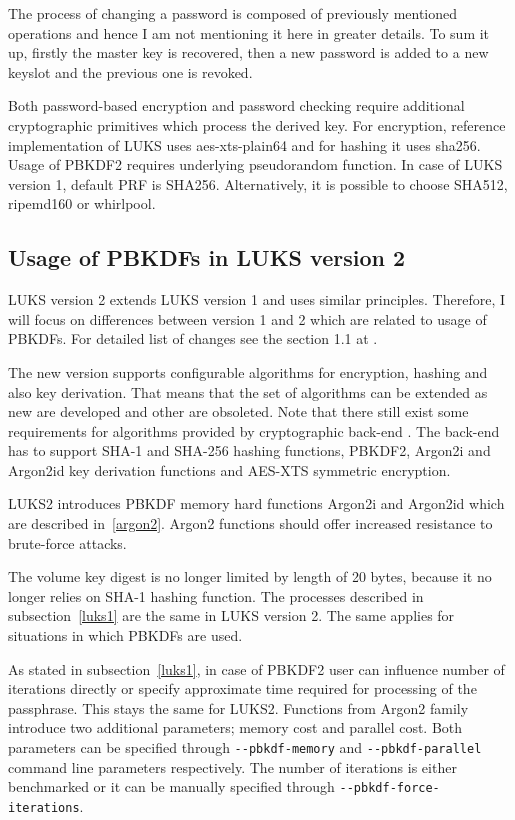\documentclass[nolof]{fithesis3}
\begin{document}
The process of changing a password is composed of previously mentioned operations and hence I am not mentioning it here in greater details. To sum it up, firstly the master key is recovered, then a new password is added to a new keyslot and the previous one is revoked.

Both password-based encryption and password checking require additional cryptographic primitives which process the derived key. For encryption, reference implementation of LUKS uses aes-xts-plain64 and for hashing it uses sha256. Usage of PBKDF2 requires underlying pseudorandom function. In case of LUKS version 1, default PRF is SHA256. Alternatively, it is possible to choose SHA512, ripemd160 or whirlpool.

\subsection{Usage of PBKDFs in LUKS version 2}
\label{luks2pbkdf}
LUKS version 2 extends LUKS version 1 and uses similar principles. Therefore, I will focus on differences between version 1 and 2 which are related to usage of PBKDFs. For detailed list of changes see the section 1.1 at \parencite{luks2}.

The new version supports configurable algorithms for encryption, hashing and also key derivation. That means that the set of algorithms can be extended as new are developed and other are obsoleted. Note that there still exist some requirements for algorithms provided by cryptographic back-end \parencite{luks2}. The back-end has to support SHA-1 and SHA-256 hashing functions, PBKDF2, Argon2i and Argon2id key derivation functions and AES-XTS symmetric encryption.

LUKS2 introduces PBKDF memory hard functions Argon2i and Argon2id which are described in~\ref{argon2}. Argon2 functions should offer increased resistance to brute-force attacks.

The volume key digest is no longer limited by length of 20 bytes, because it no longer relies on SHA-1 hashing function. The processes described in subsection~\ref{luks1} are the same in LUKS version 2. The same applies for situations in which PBKDFs are used. 

As stated in subsection~\ref{luks1},  in case of PBKDF2 user can influence number of iterations directly or specify approximate time required for processing of the passphrase. This stays the same for LUKS2. Functions from Argon2 family introduce two additional parameters; memory cost and parallel cost. Both parameters can be specified through \verb+--pbkdf-memory+ and \verb+--pbkdf-parallel+ command line parameters respectively. The number of iterations is either benchmarked or it can be manually specified through \verb+--pbkdf-force-iterations+.
\end{document}
